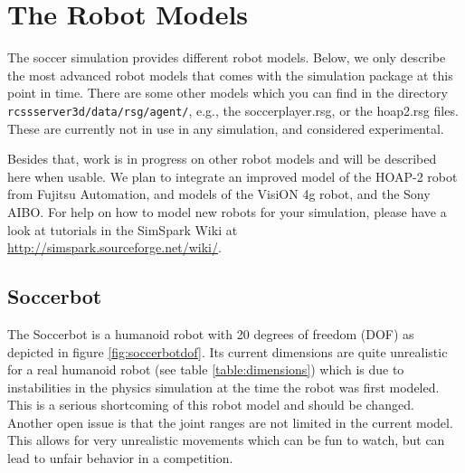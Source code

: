\chapter{The Robot Models}
\label{cha:robots}


The soccer simulation provides different robot models.
Below, we only describe the most advanced robot models that comes with the simulation package at this point in time. There are some other models which you can find in the directory \texttt{rcssserver3d/data/rsg/agent/}, e.g., the soccerplayer.rsg, or the hoap2.rsg files. These are currently not in use in any simulation, and considered experimental.

Besides that, work is in progress on other robot models and will be described here when usable. We plan to integrate an improved model of the HOAP-2 robot from Fujitsu Automation, and models of the VisiON 4g robot, and the Sony AIBO. For help on how to model new robots for your simulation, please have a look at tutorials in the SimSpark Wiki at \\

\url{http://simspark.sourceforge.net/wiki/}.





\section{Soccerbot}

The Soccerbot is a humanoid robot with 20 degrees of freedom (DOF) as depicted in figure \ref{fig:soccerbotdof}. Its current dimensions are quite unrealistic for a real humanoid robot (see table \ref{table:dimensions}) which is due to instabilities in the physics simulation at the time the robot was first modeled. This is a serious shortcoming of this robot model and should be changed. Another open issue is that the joint ranges are not limited in the current model. This allows for very unrealistic movements which can be fun to watch, but can lead to unfair behavior in a competition.


